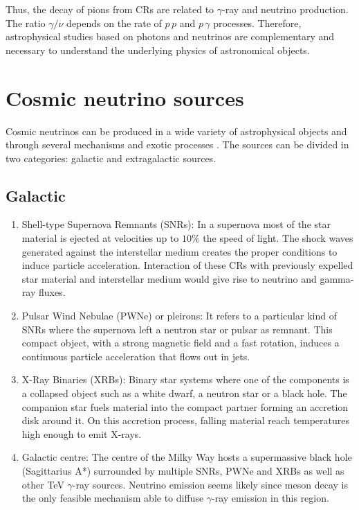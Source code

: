 Thus, the decay of pions from CRs are related to $\gamma$-ray and neutrino production. The ratio $\gamma/\nu$ depends on the rate of $p\,p$ and $p\,\gamma$ processes. Therefore, astrophysical studies based on photons and neutrinos are complementary and necessary to understand the underlying physics of astronomical objects.

\section{Cosmic neutrino sources}

Cosmic neutrinos can be produced in a wide variety of astrophysical objects and through several mechanisms and exotic processes \cite{Agus, sources, sources2, sources3}. The sources can be divided in two categories: galactic and extragalactic sources.

\subsection{Galactic}

\begin{enumerate}[label=\textbullet]

	\item Shell-type Supernova Remnants (SNRs): In a supernova most of the star material is ejected at velocities up to $10\%$ the speed of light. The shock waves generated against the interstellar medium creates the proper conditions to induce particle acceleration. Interaction of these CRs with previously expelled star material and interstellar medium would give rise to neutrino and gamma-ray fluxes.
	
	\item Pulsar Wind Nebulae (PWNe) or pleirons: It refers to a particular kind of SNRs where the supernova left a neutron star or pulsar as remnant. This compact object, with a strong magnetic field and a fast rotation, induces a continuous particle acceleration that flows out in jets.
	
	\item X-Ray Binaries (XRBs): Binary star systems where one of the components is a collapsed object such as a white dwarf, a neutron star or a black hole. The companion star fuels material into the compact partner forming an accretion disk around it. On this accretion process, falling material reach temperatures high enough to emit X-rays.
	
	\item Galactic centre: The centre of the Milky Way hosts a supermassive black hole (Sagittarius A*) surrounded by multiple SNRs, PWNe and XRBs as well as other TeV $\gamma$-ray sources. Neutrino emission seems likely since meson decay is the only feasible mechanism able to diffuse $\gamma$-ray emission in this region.
	
\end{enumerate}

